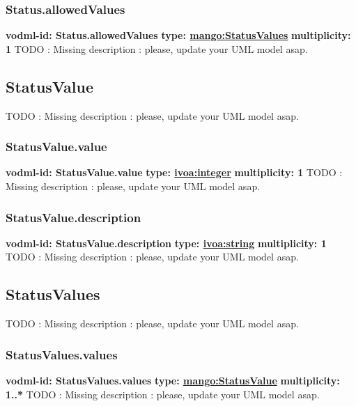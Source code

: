     \subsubsection{Status.allowedValues}
      \textbf{vodml-id: Status.allowedValues} \newline
      \textbf{type: \hyperref[sect:StatusValues]{mango:StatusValues}} \newline
      \textbf{multiplicity: 1} \newline
      TODO : Missing description : please, update your UML model asap.

  \subsection{StatusValue}
  \label{sect:StatusValue}
    TODO : Missing description : please, update your UML model asap.

    \subsubsection{StatusValue.value}
      \textbf{vodml-id: StatusValue.value} \newline
      \textbf{type: \hyperref[sect:ivoa]{ivoa:integer}} \newline
      \textbf{multiplicity: 1} \newline
      TODO : Missing description : please, update your UML model asap.

    \subsubsection{StatusValue.description}
      \textbf{vodml-id: StatusValue.description} \newline
      \textbf{type: \hyperref[sect:ivoa]{ivoa:string}} \newline
      \textbf{multiplicity: 1} \newline
      TODO : Missing description : please, update your UML model asap.

  \subsection{StatusValues}
  \label{sect:StatusValues}
    TODO : Missing description : please, update your UML model asap.

    \subsubsection{StatusValues.values}
      \textbf{vodml-id: StatusValues.values} \newline
      \textbf{type: \hyperref[sect:StatusValue]{mango:StatusValue}} \newline
      \textbf{multiplicity: 1..*} \newline
      TODO : Missing description : please, update your UML model asap.

